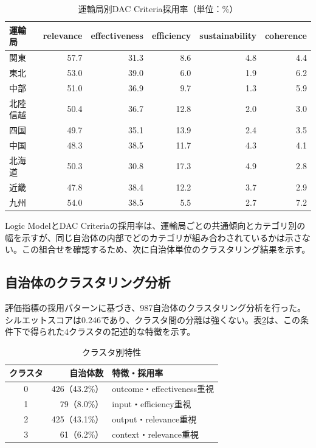 \begin{table}[htbp]
\caption{運輸局別DAC Criteria採用率（単位：\%）}
\label{tab:dac_bureau}
\centering
\begin{tabular}{lrrrrr}
\toprule
運輸局 & relevance & effectiveness & efficiency & sustainability & coherence \\
\midrule
関東 & 57.7 & 31.3 & 8.6 & 4.8 & 4.4 \\
東北 & 53.0 & 39.0 & 6.0 & 1.9 & 6.2 \\
中部 & 51.0 & 36.9 & 9.7 & 1.3 & 5.9 \\
北陸信越 & 50.4 & 36.7 & 12.8 & 2.0 & 3.0 \\
四国 & 49.7 & 35.1 & 13.9 & 2.4 & 3.5 \\
中国 & 48.3 & 38.5 & 11.7 & 4.3 & 4.1 \\
北海道 & 50.3 & 30.8 & 17.3 & 4.9 & 2.8 \\
近畿 & 47.8 & 38.4 & 12.2 & 3.7 & 2.9 \\
九州 & 54.0 & 38.5 & 5.5 & 2.7 & 7.2 \\
\bottomrule
\end{tabular}
\end{table}

Logic ModelとDAC Criteriaの採用率は、運輸局ごとの共通傾向とカテゴリ別の幅を示すが、同じ自治体の内部でどのカテゴリが組み合わされているかは示さない。この組合せを確認するため、次に自治体単位のクラスタリング結果を示す。

\subsection{自治体のクラスタリング分析}

評価指標の採用パターンに基づき、987自治体のクラスタリング分析を行った。シルエットスコアは0.246であり、クラスタ間の分離は強くない。表\ref{tab:cluster}は、この条件下で得られた4クラスタの記述的な特徴を示す。

\begin{table}[htbp]
\caption{クラスタ別特性}
\label{tab:cluster}
\centering
\begin{tabular}{crp{8cm}}
\toprule
クラスタ & 自治体数 & 特徴・採用率 \\
\midrule
0 & 426（43.2\%） & outcome・effectiveness重視 \\
1 & 79（8.0\%） & input・efficiency重視 \\
2 & 425（43.1\%） & output・relevance重視 \\
3 & 61（6.2\%） & context・relevance重視 \\
\bottomrule
\end{tabular}
\end{table}

